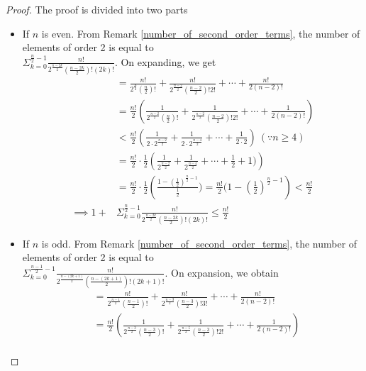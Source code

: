 \documentclass[oneside]{amsart}
\theoremstyle{plain}
\theoremstyle{definition}
\theoremstyle{remark}
\begin{document}
    \begin{proof}
        The proof is divided into two parts
        \begin{itemize}
            \item[Case (i)] If $n$ is even. 
            From Remark \ref{number_of_second_order_terms}, the number of elements of order 2 is equal to \\$\Sigma_{k = 0}^{\frac{n}{2} - 1} \frac{n!}{2^{\frac{n - 2k}{2}}\left(\frac{n - 2k}{2}\right)!\left(2k\right)!} $. On expanding, we get
            \begin{align*}
                 &= \frac{n!}{2^{\frac{n}{2}}(\frac{n}{2})!} + \frac{n!}{2^{\frac{n - 2}{2}}(\frac{n - 2}{2})!2!} + \cdots + \frac{n!}{2(n - 2)!}\\
                &= \frac{n!}{2}\left(\frac{1}{2^{\frac{n - 2}{2}}(\frac{n}{2})!} + \frac{1}{2^{\frac{n - 2}{2}}(\frac{n - 2}{2})!2!} + \cdots + \frac{1}{2(n - 2)!}\right)\\
                & < \frac{n!}{2}\left(\frac{1}{2\cdot 2^{\frac{n - 2}{2}}} + \frac{1}{2\cdot 2^{\frac{n - 4}{2}}} + \cdots + \frac{1}{2\cdot 2}\right)\ (\because n \geq 4)\\
                &= \frac{n!}{2}\cdot\frac{1}{2}\left(\frac{1}{2^\frac{n - 2}{2}} + \frac{1}{2^\frac{n - 4}{2}} + \cdots + \frac{1}{2} + 1)\right)\\
                &= \frac{n!}{2}\cdot\frac{1}{2}\left(\frac{1 - (\frac{1}{2})^{\frac{n}{2} - 1}}{\frac{1}{2}})= \frac{n!}{2}(1 - (\frac{1}{2})^{\frac{n}{2} - 1}\right) < \frac{n!}{2} \\
                 \implies 1 + & \Sigma_{k = 0}^{\frac{n}{2} - 1} \frac{n!}{2^{\frac{n - 2k}{2}}\left(\frac{n - 2k}{2}\right)!\left(2k\right)!} \leq \frac{n!}{2}
            \end{align*}
            \item[Case (ii)] If $n$ is odd. 
            From Remark \ref{number_of_second_order_terms}, the number of elements of order 2 is equal to \\
            $\Sigma_{k = 0}^{\frac{n - 1}{2} - 1} \frac{n!}{2^{\frac{n - (2k + 1)}{2}}\left(\frac{n - (2k + 1)}{2}\right)!\left(2k + 1\right)!}$. On expansion, we obtain
            \begin{align*}
                &= \frac{n!}{2^{\frac{n - 1}{2}}(\frac{n - 1}{2})!} + \frac{n!}{2^{\frac{n - 3}{2}}(\frac{n - 3}{2})!3!} + \cdots + \frac{n!}{2(n - 2)!}\\
                &= \frac{n!}{2}\left(\frac{1}{2^{\frac{n - 3}{2}}(\frac{n - 3}{2})!} + \frac{1}{2^{\frac{n - 5}{2}}(\frac{n - 3}{2})!2!} + \cdots + \frac{1}{2(n - 2)!}\right)\\

\end{align*}
\end{itemize}
\end{proof}
\end{document}
